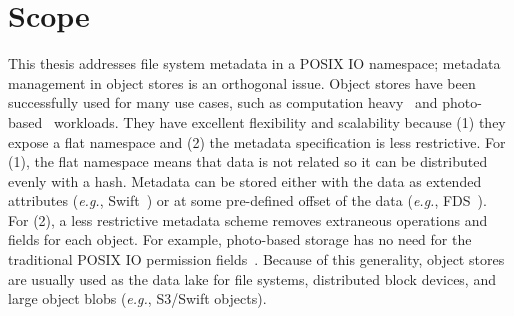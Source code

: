 
\section{Scope}

This thesis addresses file system metadata in a POSIX IO namespace; metadata
management in object stores is an orthogonal issue.  Object stores have been
successfully used for many use cases, such as computation
heavy~\cite{nightingale:osdi2012-fds} and
photo-based~\cite{beaver:osdi2010-haystack} workloads.  They have excellent
flexibility and scalability because (1) they expose a flat namespace and (2)
the metadata specification is less restrictive. For (1), the flat namespace
means that data is not related so it can be distributed evenly with a hash.
Metadata can be stored either with the data as extended attributes ({\it e.g.},
Swift~\cite{toor:nas2012-swift}) or at some pre-defined offset of the data
({\it e.g.}, FDS~\cite{nightingale:osdi2012-fds}). For (2), a less restrictive
metadata scheme removes extraneous operations and fields for each object. For
example, photo-based storage has no need for the traditional POSIX IO
permission fields~\cite{beaver:osdi2010-haystack}. Because of this generality,
object stores are usually used as the data lake for file systems, distributed
block devices, and large object blobs ({\it e.g.}, S3/Swift objects).

